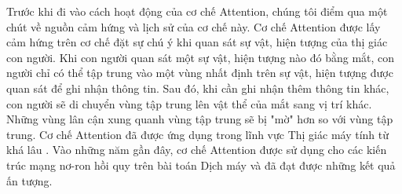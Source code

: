 Trước khi đi vào cách hoạt động của cơ chế Attention, chúng tôi điểm qua một chút về nguồn cảm hứng và lịch sử của cơ chế này. Cơ chế Attention được lấy cảm hứng trên cơ chế đặt sự chú ý khi quan sát sự vật, hiện tượng của thị giác con người. Khi con người quan sát một sự vật, hiện tượng nào đó bằng mắt, con người chỉ có thể tập trung vào một vùng nhất định trên sự vật, hiện tượng được quan sát để ghi nhận thông tin. Sau đó, khi cần ghi nhận thêm thông tin khác, con người sẽ di chuyển vùng tập trung lên vật thể của mắt sang vị trí khác. Những vùng lân cận xung quanh vùng tập trung sẽ bị "mờ" hơn so với vùng tập trung. Cơ chế Attention đã được ứng dụng trong lĩnh vực Thị giác máy tính từ khá lâu \cite{attentionhistory2010} \cite{attentionhistory2011}. Vào những năm gần đây, cơ chế Attention được sử dụng cho các kiến trúc mạng nơ-ron hồi quy trên bài toán Dịch máy và đã đạt được những kết quả ấn tượng.

